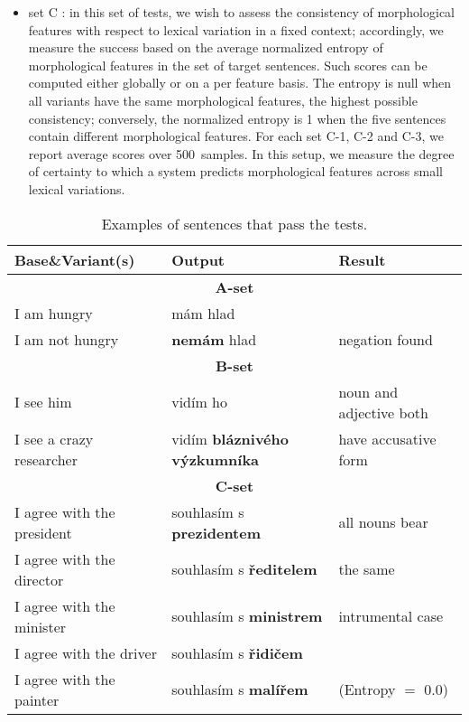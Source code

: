 \documentclass[11pt,letterpaper,final,nohyperref]{article}
\begin{document}
\begin{itemize}
\item set C : in this set of tests, we wish to assess the consistency of morphological features with respect to lexical variation in a fixed context; accordingly, we measure the success based on the average normalized entropy of morphological features in the set of target sentences. 
Such scores can be computed either globally or on a per feature basis. The entropy is null when all variants have the same morphological features, the highest possible consistency; conversely, the normalized entropy is 1 when the five sentences contain different morphological features. For each set C-1, C-2 and C-3, we report average scores over 500~samples. In this setup, we measure the degree of certainty to which a system predicts morphological features across small lexical variations.
\end{itemize}

\begin{table*}[t]
\begin{center}
\small
\begin{tabular}{ lll } 
\hline
\textbf{Base\&Variant(s)} & \textbf{Output} & \textbf{Result} \\
\hline
\multicolumn{3}{c}{\textbf{A-set}} \\
\hline
I am hungry & m\'am hlad & \\
I am not hungry & \textbf{nem\'am} hlad & negation found \\
\hline
\multicolumn{3}{c}{\textbf{B-set}} \\
\hline
I see him & vid\'im ho & noun and adjective both \\
I see a crazy researcher & vid\'im \textbf{bl\'azniv\'eho v\'yzkumn\'ika} &  have accusative form \\
\hline
\multicolumn{3}{c}{\textbf{C-set}} \\
\hline
I agree with the president & souhlas\'im s \textbf{prezidentem} &  all nouns bear \\
I agree with the director & souhlas\'im s \textbf{\v{r}editelem} &  the same \\
I agree with the minister & souhlas\'im s \textbf{ministrem} & intrumental case \\
I agree with the driver & souhlas\'im s \textbf{\v{r}idi\v{c}em} &  \\
I agree with the painter & souhlas\'im s \textbf{mal\'i\v{r}em} & (Entropy $=$ 0.0) \\
\hline
 \end{tabular} 
\caption{\label{table:eval_feat} Examples of sentences that pass the tests.}
\end{center}
\end{table*}
\end{document}
